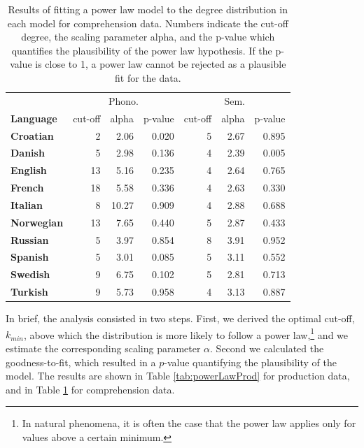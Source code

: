 \documentclass[english,floatsintext,man]{apa6}
\theoremstyle{definition}
\theoremstyle{definition}
\theoremstyle{definition}
\theoremstyle{remark}
\begin{document}
\begin{table}

\caption{\label{tab:powerLawComp}Results of fitting a power law model to the degree distribution in each model for comprehension data. Numbers indicate the cut-off degree, the scaling parameter alpha, and the p-value which quantifies the plausibility of the power law hypothesis. If the p-value is close to 1, a power law cannot be rejected as a plausible fit for the data.}
\centering
\begin{tabular}[t]{>{\bfseries}lrrrrrr}
\toprule
\multicolumn{1}{c}{} & \multicolumn{3}{c}{Phono.} & \multicolumn{3}{c}{Sem.} \\
\cmidrule(l{2pt}r{2pt}){2-4} \cmidrule(l{2pt}r{2pt}){5-7}
Language & cut-off & alpha & p-value & cut-off & alpha & p-value\\
\midrule
Croatian & 2 & 2.06 & 0.020 & 5 & 2.67 & 0.895\\
Danish & 5 & 2.98 & 0.136 & 4 & 2.39 & 0.005\\
English & 13 & 5.16 & 0.235 & 4 & 2.64 & 0.765\\
French & 18 & 5.58 & 0.336 & 4 & 2.63 & 0.330\\
Italian & 8 & 10.27 & 0.909 & 4 & 2.88 & 0.688\\
Norwegian & 13 & 7.65 & 0.440 & 5 & 2.87 & 0.433\\
Russian & 5 & 3.97 & 0.854 & 8 & 3.91 & 0.952\\
Spanish & 5 & 3.01 & 0.085 & 5 & 3.11 & 0.552\\
Swedish & 9 & 6.75 & 0.102 & 5 & 2.81 & 0.713\\
Turkish & 9 & 5.73 & 0.958 & 4 & 3.13 & 0.887\\
\bottomrule
\end{tabular}
\end{table}

In brief, the analysis consisted in two steps. First, we derived the
optimal cut-off, \(k_{min}\), above which the distribution is more
likely to follow a power
law,\footnote{In natural phenomena, it is often the case that the power law applies only for values above a certain minimum.}
and we estimate the corresponding scaling parameter \(\alpha\). Second
we calculated the goodness-to-fit, which resulted in a \(p\)-value
quantifying the plausibility of the model. The results are shown in
Table \ref{tab:powerLawProd} for production data, and in Table
\ref{tab:powerLawComp} for comprehension data.
\end{document}
